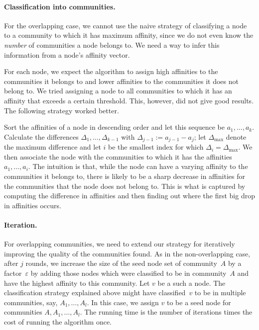 \paragraph{Classification into communities.} For the overlapping case, we cannot
use the naive strategy of classifying a node to a community to which it has 
maximum affinity, since we do not even know the \emph{number} of communities a node belongs to. 
We need a way to infer this information from a node's affinity vector.

For each node, we expect the algorithm to assign high affinities to the communities 
it belongs to and lower affinities to the communities it does not belong to. 
We tried assigning a node to all communities to which it has an affinity that 
exceeds a certain threshold. This, however, did not give good results.
The following strategy worked better. 

Sort the affinities of a node in descending order and let this 
sequence be $a_1, \ldots, a_k$. Calculate the differences 
$\Delta_{1}, \ldots, \Delta_{k-1}$ with $\Delta_{j-1} := a_{j - 1} - a_j$;
let $\Delta_{\mathrm{max}}$ denote the maximum difference 
and let $i$ be the smallest index for which $\Delta_i = \Delta_{\mathrm{max}}$. We then associate 
the node with the communities to which it has the affinities $a_1, \ldots, a_i$. 
The intuition is that, while the node can have a varying affinity to the communities it belongs to, 
there is likely to be a sharp decrease in affinities for the communities that the node does 
not belong to. This is what is captured by computing the difference in affinities and then finding 
out where the first big drop in affinities occurs.

\paragraph{Iteration.}
For overlapping communities, we need to extend our strategy for iteratively improving the quality 
of the communities found. As in the non-overlapping case, after $j$ rounds, we increase the 
size of the seed node set of community~$A$ by a factor~$\varepsilon$ by adding those nodes 
which were classified to be in community~$A$ and have the highest affinity to this community. 
Let $v$ be a such a node. The classification strategy explained above might have classified~$v$ 
to be in multiple communities, say, $A_1, \dots, A_l$. In this case, we assign $v$ 
to be a seed node for communities $A, A_1, \ldots, A_l$. The running time is the number of 
iterations times the cost of running the algorithm once.











